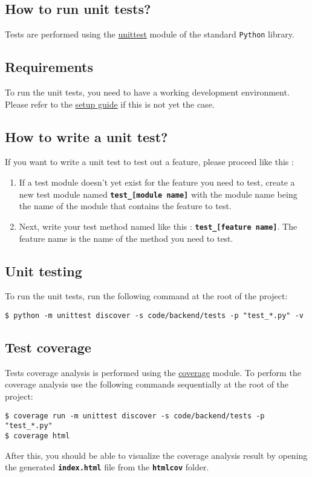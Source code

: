 \subsection{How to run unit tests?}
Tests are performed using the \href{https://docs.python.org/3/library/unittest.html}{unittest} module of the standard \texttt{Python} library.

\subsection{Requirements}
To run the unit tests, you need to have a working development environment. Please refer to the \hyperref[sec:setup-guide]{setup guide} if this is not yet the case. 

\subsection{How to write a unit test?}
If you want to write a unit test to test out a feature, please proceed like this :
\begin{enumerate}
    \item If a test module doesn't yet exist for the feature you need to test, create a new test module named \texttt{\textbf{test\_[module name]}} with the module name being the name of the module that contains the feature to test. \\
    
    \item Next, write your test method named like this : \textbf{\texttt{test\_[feature name]}}. The feature name is the name of the method you need to test.
\end{enumerate}
\subsection{Unit testing}
To run the unit tests, run the following command at the root of the project: 
\begin{codebox}
    \large\texttt{\$ python -m unittest discover -s code/backend/tests -p "test\_*.py" -v}
\end{codebox}
\clearpage
\subsection{Test coverage}
Tests coverage analysis is performed using the \href{https://coverage.readthedocs.io/en/7.5.1/}{coverage} module.
To perform the coverage analysis use the following commands sequentially at the root of the project:
\begin{codebox}
    \large\texttt{\$ coverage run -m unittest discover -s code/backend/tests -p "test\_*.py"}\\
    \large\texttt{\$ coverage html}
\end{codebox}
\vspace{0.25cm}
After this, you should be able to visualize the coverage analysis result by opening the generated \textbf{\texttt{index.html}} file from the \textbf{\texttt{htmlcov}} folder. 